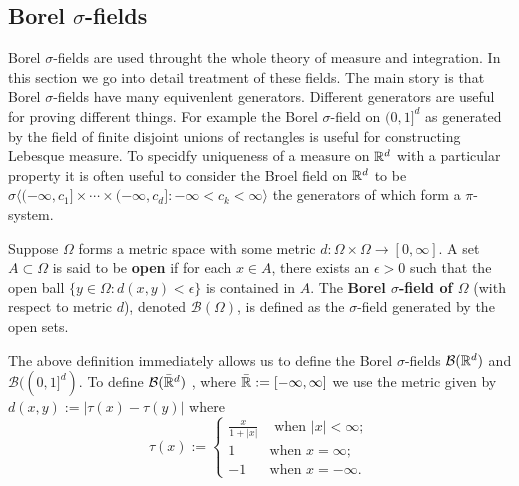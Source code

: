 





\subsection{Borel $\sigma$-fields}
Borel $\sigma$-fields are used throught the whole theory of measure and integration. In this section we go into detail treatment of these fields. The main story is that Borel $\sigma$-fields have many equivenlent generators. Different generators are useful for proving different things. For example the Borel $\sigma$-field on $(0,1]^d$ as generated by the field of finite disjoint unions of rectangles is useful for constructing Lebesque measure. To specidfy uniqueness of a measure on $\Bbb R^d$ with a particular property it is often useful to consider the Broel field on $\Bbb R^d$ to be $\sigma\bigl\langle (-\infty,c_1]\times \cdots \times (-\infty, c_d]: -\infty < c_k< \infty \bigr\rangle$ the generators of which form a $\pi$-system.


\begin{definition}
Suppose $\Omega$ forms a metric space with some metric $d:\Omega\times\Omega\rightarrow [0,\infty]$. A set $A\subset \Omega$ is said to be {\bf open} if for each $x\in A$, there exists an $\epsilon>0$ such that the {open ball} $\{y\in\Omega: d(x,y)<\epsilon \}$ is contained in $A$. The {\bf Borel $\sigma$-field of $\Omega$} (with respect to metric $d$), denoted $\mathcal B(\Omega)$, is defined as the $\sigma$-field generated by the open sets.
\end{definition}

The above definition immediately allows us to define the Borel $\sigma$-fields  $\mathcal B(\Bbb R^d)$ and $\mathcal B((0,1]^d)$. To define $\mathcal B(\bar{\Bbb R}^d)$ , where $\bar{\Bbb R}:=[-\infty, \infty]$ we use the metric given by $d(x,y):= |\tau(x) - \tau(y)|$ where
\begin{equation}
\label{eq: generate extended metric}
\tau(x):=\begin{cases} \frac{x}{1+|x|} &\text{ when $|x|<\infty$};\\
 1 &\text{when $x=\infty$};\\
  -1&\text{when $x=-\infty$}.
 \end{cases}
 \end{equation}




